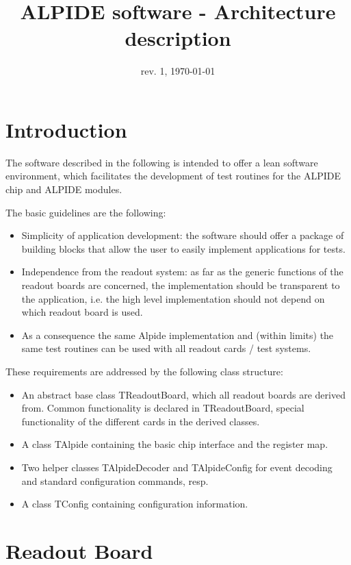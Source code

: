 \documentclass{article}
\let\oldsection\section
\renewcommand\section{\clearpage\oldsection}
\begin{document}
\title{ALPIDE software - Architecture description}
\date{rev. 1, \today}

\maketitle


\section{Introduction}

The software described in the following is intended to offer a lean
software environment, which facilitates the development of test
routines for the ALPIDE chip and ALPIDE modules. 

The basic guidelines are the following: 

\begin{itemize}
\item Simplicity of application development: the software should offer
  a package of building blocks that allow the user to easily implement
  applications for tests. 
\item Independence from the readout system: as far as the generic
  functions of the readout boards are concerned, the implementation
  should be transparent to the application, i.e. the high level
  implementation should not depend on which readout board is used. 
\item As a consequence the same Alpide implementation and (within
  limits) the same test routines can be used with all readout cards /
  test systems.
\end{itemize}


These requirements are addressed by the following class structure:
\begin{itemize}
\item An abstract base class TReadoutBoard, which all readout boards
  are derived from. Common functionality is declared in TReadoutBoard,
  special functionality of the different cards in the derived
  classes. 
\item A class TAlpide containing the basic chip interface and the
  register map. 
\item Two helper classes TAlpideDecoder and TAlpideConfig for event
  decoding and standard configuration commands, resp.
\item A class TConfig containing configuration information.
\end{itemize}


\section{Readout Board}
\end{document}
